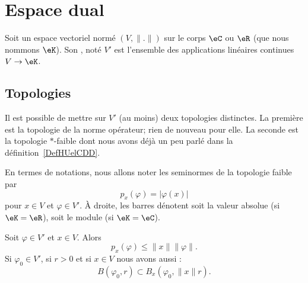 \section{Espace dual}
\label{SECooKOJNooQVawFY}

\begin{definition}
	Soit un espace vectoriel normé \( (V,\| . \|)\) sur le corps \( \eC\) ou \( \eR\) (que nous nommons \( \eK\)). Son , noté \( V'\) est l'ensemble des applications linéaires continues \( V\to \eK\).
\end{definition}

\subsection{Topologies}

Il est possible de mettre sur \( V'\) (au moins) deux topologies distinctes. La première est la topologie de la norme opérateur; rien de nouveau pour elle. La seconde est la topologie \( *\)-faible dont nous avons déjà un peu parlé dans la définition~\ref{DefHUelCDD}.

En termes de notations, nous allons noter les seminormes de la topologie faible par
\begin{equation}
	p_x(\varphi)=| \varphi(x) |
\end{equation}
pour \( x\in V\) et \( \varphi\in V'\). À droite, les barres dénotent soit la valeur absolue (si \( \eK=\eR\)), soit le module (si \( \eK=\eC\)).

\begin{lemma}       \label{LEMooFMAUooQBIeTh}
	Soit \( \varphi\in V'\) et \( x\in V\). Alors
	\begin{equation}
		p_x(\varphi)\leq \| x \|\| \varphi \|.
	\end{equation}
	Si \( \varphi_0\in V'\), si \( r>0\) et si \( x\in V\) nous avons aussi :
	\begin{equation}
		B(\varphi_0,r)\subset B_x(\varphi_0, \| x \|r ).
	\end{equation}
\end{lemma}

